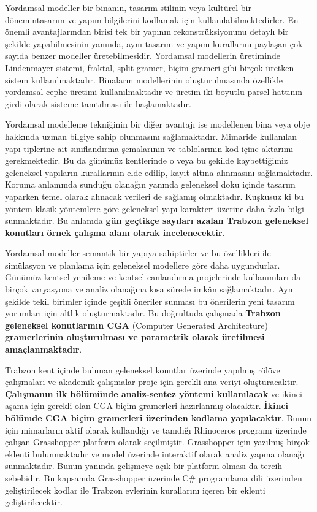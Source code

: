 \documentclass[12pt,turkish,a4paperpaper,]{report}
\begin{document}
Yordamsal modeller bir binanın, tasarım stilinin veya kültürel bir
dönemintasarım ve yapım bilgilerini kodlamak için
kullanılabilmektedirler. En önemli avantajlarından birisi tek bir
yapının rekonstrüksiyonunu detaylı bir şekilde yapabilmesinin yanında,
aynı tasarım ve yapım kurallarını paylaşan çok sayıda benzer modeller
üretebilmesidir. Yordamsal modellerin üretiminde Lindenmayer sistemi,
fraktal, split gramer, biçim grameri gibi birçok üretken sistem
kullanılmaktadır. Binaların modellerinin oluşturulmasında özellikle
yordamsal cephe üretimi kullanılmaktadır ve üretim iki boyutlu parsel
hattının girdi olarak sisteme tanıtılması ile başlamaktadır.

Yordamsal modelleme tekniğinin bir diğer avantajı ise modellenen bina
veya obje hakkında uzman bilgiye sahip olunmasını sağlamaktadır.
Mimaride kullanılan yapı tiplerine ait sınıflandırma şemalarının ve
tablolarının kod içine aktarımı gerekmektedir. Bu da günümüz kentlerinde
o veya bu şekilde kaybettiğimiz geleneksel yapıların kurallarının elde
edilip, kayıt altına alınmasını sağlamaktadır. Koruma anlamında sunduğu
olanağın yanında geleneksel doku içinde tasarım yaparken temel olarak
alınacak verileri de sağlamış olmaktadır. Kuşkusuz ki bu yöntem klasik
yöntemlere göre geleneksel yapı karakteri üzerine daha fazla bilgi
sunmaktadır. Bu anlamda \textbf{gün geçtikçe sayıları azalan Trabzon
geleneksel konutları örnek çalışma alanı olarak incelenecektir}.

Yordamsal modeller semantik bir yapıya sahiptirler ve bu özellikleri ile
simülasyon ve planlama için geleneksel modellere göre daha uygundurlar.
Günümüz kentsel yenileme ve kentsel canlandırma projelerinde
kullanımları da birçok varyasyona ve analiz olanağına kısa sürede imkân
sağlamaktadır. Aynı şekilde tekil birimler içinde çeşitli öneriler
sunması bu önerilerin yeni tasarım yorumları için altlık
oluşturmaktadır. Bu doğrultuda çalışmada \textbf{Trabzon geleneksel
konutlarının CGA} (Computer Generated Architecture)
\textbf{gramerlerinin oluşturulması ve parametrik olarak üretilmesi
amaçlanmaktadır}.

Trabzon kent içinde bulunan geleneksel konutlar üzerinde yapılmış rölöve
çalışmaları ve akademik çalışmalar proje için gerekli ana veriyi
oluşturacaktır. \textbf{Çalışmanın ilk bölümünde analiz-sentez yöntemi
kullanılacak} ve ikinci aşama için gerekli olan CGA biçim gramerleri
hazırlanmış olacaktır. \textbf{İkinci bölümde CGA biçim gramerleri
üzerinden kodlama yapılacaktır}. Bunun için mimarların aktif olarak
kullandığı ve tanıdığı Rhinoceros programı üzerinde çalışan Grasshopper
platform olarak seçilmiştir. Grasshopper için yazılmış birçok eklenti
bulunmaktadır ve model üzerinde interaktif olarak analiz yapma olanağı
sunmaktadır. Bunun yanında gelişmeye açık bir platform olması da tercih
sebebidir. Bu kapsamda Grasshopper üzerinde C\# programlama dili
üzerinden geliştirilecek kodlar ile Trabzon evlerinin kurallarını içeren
bir eklenti geliştirilecektir.
\end{document}
